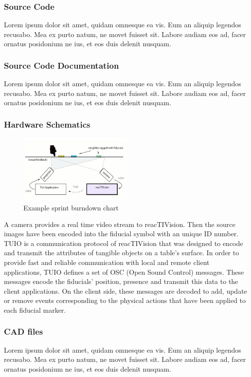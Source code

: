 \subsubsection{Source Code}
Lorem ipsum dolor sit amet, quidam omnesque ea vis. Eum an aliquip legendos recusabo. Mea ex purto natum, ne movet fuisset sit. Labore audiam eos ad, facer ornatus posidonium ne ius, et eos duis delenit nusquam.

\subsubsection{Source Code Documentation}
Lorem ipsum dolor sit amet, quidam omnesque ea vis. Eum an aliquip legendos recusabo. Mea ex purto natum, ne movet fuisset sit. Labore audiam eos ad, facer ornatus posidonium ne ius, et eos duis delenit nusquam.

\subsubsection{Hardware Schematics}
\begin{figure}[h!]
    \centering
    \includegraphics[width=0.5\textwidth]{images/Diagram.jpg}
    \caption{Example sprint burndown chart}
\end{figure}
A camera provides a real time video stream to reacTIVision. Then the source images have been encoded into the fiducial symbol with an unique ID number. TUIO is a communication protocol of reacTIVision that was designed to encode and transmit the attributes of tangible objects on a table's surface. In order to provide fast and reliable communication with local and remote client applications, TUIO defines a set of OSC (Open Sound Control) messages. These messages encode the fiducials' position, presence and transmit this data to the client applications. On the client side, these messages are decoded to add, update or remove events corresponding to the physical actions that have been applied to each fiducial marker.

\subsubsection{CAD files}
Lorem ipsum dolor sit amet, quidam omnesque ea vis. Eum an aliquip legendos recusabo. Mea ex purto natum, ne movet fuisset sit. Labore audiam eos ad, facer ornatus posidonium ne ius, et eos duis delenit nusquam.

